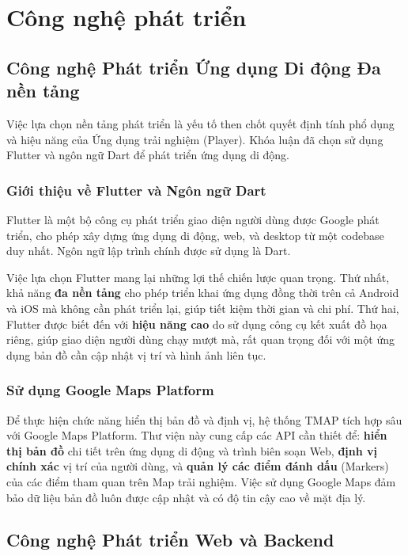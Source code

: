 \chapter{Công nghệ phát triển}

\section{Công nghệ Phát triển Ứng dụng Di động Đa nền tảng}

Việc lựa chọn nền tảng phát triển là yếu tố then chốt quyết định tính phổ dụng và hiệu năng của Ứng dụng trải nghiệm (Player). Khóa luận đã chọn sử dụng Flutter và ngôn ngữ Dart để phát triển ứng dụng di động.

\subsection{Giới thiệu về Flutter và Ngôn ngữ Dart}

Flutter là một bộ công cụ phát triển giao diện người dùng được Google phát triển, cho phép xây dựng ứng dụng di động, web, và desktop từ một codebase duy nhất. Ngôn ngữ lập trình chính được sử dụng là Dart.

Việc lựa chọn Flutter mang lại những lợi thế chiến lược quan trọng. Thứ nhất, khả năng \textbf{đa nền tảng} cho phép triển khai ứng dụng đồng thời trên cả Android và iOS mà không cần phát triển lại, giúp tiết kiệm thời gian và chi phí. Thứ hai, Flutter được biết đến với \textbf{hiệu năng cao} do sử dụng công cụ kết xuất đồ họa riêng, giúp giao diện người dùng chạy mượt mà, rất quan trọng đối với một ứng dụng bản đồ cần cập nhật vị trí và hình ảnh liên tục.

\subsection{Sử dụng Google Maps Platform}

Để thực hiện chức năng hiển thị bản đồ và định vị, hệ thống TMAP tích hợp sâu với Google Maps Platform. Thư viện này cung cấp các API cần thiết để: \textbf{hiển thị bản đồ} chi tiết trên ứng dụng di động và trình biên soạn Web, \textbf{định vị chính xác} vị trí của người dùng, và \textbf{quản lý các điểm đánh dấu} (Markers) của các điểm tham quan trên Map trải nghiệm. Việc sử dụng Google Maps đảm bảo dữ liệu bản đồ luôn được cập nhật và có độ tin cậy cao về mặt địa lý.

\section{Công nghệ Phát triển Web và Backend}

